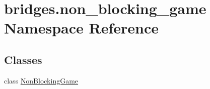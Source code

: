 \hypertarget{namespacebridges_1_1non__blocking__game}{}\section{bridges.\+non\+\_\+blocking\+\_\+game Namespace Reference}
\label{namespacebridges_1_1non__blocking__game}
\subsection*{Classes}
\begin{DoxyCompactItemize}
\item 
class \hyperlink{classbridges_1_1non__blocking__game_1_1_non_blocking_game}{Non\+Blocking\+Game}
\end{DoxyCompactItemize}

